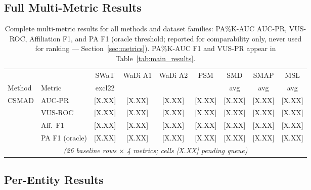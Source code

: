 \subsection{Full Multi-Metric Results}
\label{sec:appendix_full_results}

\begin{table}[tp]
\footnotesize
\centering
\caption{Complete multi-metric results for all methods and dataset families: PA\%K-AUC AUC-PR,
  VUS-ROC, Affiliation F1, and PA F1 (oracle threshold; reported for comparability only, never
  used for ranking --- Section~\ref{sec:metrics}).
  PA\%K-AUC F1 and VUS-PR appear in Table~\ref{tab:main_results}.}
\label{tab:full_metrics}
\begin{adjustbox}{max width=\linewidth}
\begin{tabular}{llccccccc}
\toprule
& & SWaT & WaDi A1 & WaDi A2 & PSM & SMD & SMAP & MSL \\
Method & Metric & excl22 & & & & avg & avg & avg \\
\midrule
CSMAD & AUC-PR   & {[X.XX]} & {[X.XX]} & {[X.XX]} & {[X.XX]} & {[X.XX]} & {[X.XX]} & {[X.XX]} \\
      & VUS-ROC  & {[X.XX]} & {[X.XX]} & {[X.XX]} & {[X.XX]} & {[X.XX]} & {[X.XX]} & {[X.XX]} \\
      & Aff.\ F1 & {[X.XX]} & {[X.XX]} & {[X.XX]} & {[X.XX]} & {[X.XX]} & {[X.XX]} & {[X.XX]} \\
      & PA F1 (oracle) & {[X.XX]} & {[X.XX]} & {[X.XX]} & {[X.XX]} & {[X.XX]} & {[X.XX]} & {[X.XX]} \\
\multicolumn{9}{c}{\textit{(26 baseline rows $\times$ 4 metrics; cells {[X.XX]} pending queue)}} \\
\bottomrule
\end{tabular}
\end{adjustbox}
\end{table}

\subsection{Per-Entity Results}
\label{sec:appendix_entity_results}

